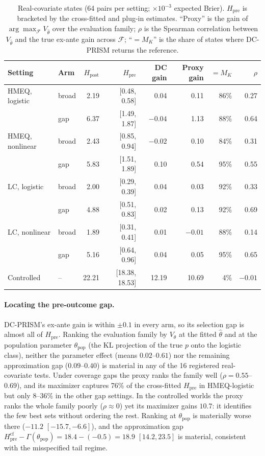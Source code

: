 \documentclass[runningheads]{llncs}
\begin{document}
\begin{table}[t]
\caption{Real-covariate states (64 pairs per setting; $\times10^{-3}$ expected Brier). $H_{\mathrm{pre}}$ is bracketed by the cross-fitted and plug-in estimates. ``Proxy'' is the gain of $\arg\max_{\mathcal F}V_{\widehat\theta}$ over the evaluation family; $\rho$ is the Spearman correlation between $V_{\widehat\theta}$ and the true ex-ante gain across $\mathcal F$; ``$=M_K$'' is the share of states where DC-PRISM returns the reference.}
\label{tab:realx}
\centering\small
\setlength{\tabcolsep}{2.5pt}
\begin{tabular}{llrrrrrr}
\toprule
Setting & Arm & $H_{\mathrm{post}}$ & $H_{\mathrm{pre}}$ & DC gain & Proxy gain & $=M_K$ & $\rho$ \\
\midrule
HMEQ, logistic & broad & 2.19 & [0.48, 0.58] & 0.04 & 0.11 & 86\% & 0.27 \\
 & gap & 6.37 & [1.49, 1.87] & $-0.04$ & 1.13 & 88\% & 0.64 \\
HMEQ, nonlinear & broad & 2.43 & [0.85, 0.94] & $-0.02$ & 0.10 & 84\% & 0.31 \\
 & gap & 5.83 & [1.51, 1.89] & 0.10 & 0.54 & 95\% & 0.55 \\
LC, logistic & broad & 2.00 & [0.29, 0.39] & 0.04 & 0.03 & 92\% & 0.33 \\
 & gap & 4.88 & [0.51, 0.83] & 0.02 & 0.13 & 92\% & 0.69 \\
LC, nonlinear & broad & 1.89 & [0.31, 0.41] & 0.01 & $-0.01$ & 88\% & 0.14 \\
 & gap & 5.16 & [0.64, 0.96] & 0.04 & 0.05 & 95\% & 0.65 \\
\midrule
Controlled & -- & 22.21 & [18.38, 18.53] & 12.19 & 10.69 & 4\% & $-0.01$ \\
\bottomrule
\end{tabular}
\end{table}

\paragraph{Locating the pre-outcome gap.} DC-PRISM's ex-ante gain is within $\pm0.1$ in every arm, so its selection gap is almost all of $H_{\mathrm{pre}}$. Ranking the evaluation family by $V_\theta$ at the fitted $\widehat\theta$ and at the population parameter $\theta_{\mathrm{pop}}$ (the KL projection of the true $p$ onto the logistic class), neither the parameter effect (means $0.02$--$0.61$) nor the remaining approximation gap ($0.09$--$0.40$) is material in any of the 16 registered real-covariate tests. Under coverage gaps the proxy ranks the family well ($\rho=0.55$--$0.69$), and its maximizer captures 76\% of the cross-fitted $H_{\mathrm{pre}}$ in HMEQ-logistic but only 8--36\% in the other gap settings. In the controlled worlds the proxy ranks the whole family poorly ($\rho\approx0$) yet its maximizer gains $10.7$: it identifies the few best sets without ordering the rest. Ranking at $\theta_{\mathrm{pop}}$ is materially worse there ($-11.2$ $[-15.7,-6.6]$), and the approximation gap $H_{\mathrm{pre}}^{\text{cf}}-\Gamma(\theta_{\mathrm{pop}})=18.4-(-0.5)=18.9$ $[14.2,23.5]$ is material, consistent with the misspecified tail regime.
\end{document}
